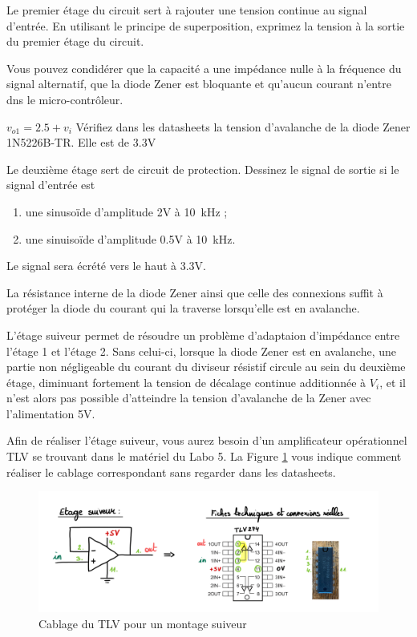 \documentclass{../template/labo}
\begin{document}
\begin{predet}

\Question
{Le premier étage du circuit sert à rajouter une tension continue au signal d'entrée. En utilisant le principe de superposition, exprimez la tension à la sortie du premier étage du circuit. 

Vous pouvez condidérer que la capacité a une impédance nulle à la fréquence du signal alternatif, que la diode Zener est bloquante et qu'aucun courant n'entre dns le micro-contrôleur. }
{$v_{o1}=2.5+v_i$}
\label{Q:zener_1}
\Question
{Vérifiez dans les datasheets la tension d'avalanche de la diode Zener 1N5226B-TR. }
{Elle est de 3.3V}
\label{Q:zener_2}
\Question
{Le deuxième étage sert de circuit de protection. Dessinez le signal de sortie si le signal d'entrée est 
\begin{enumerate}
	\item une sinusoïde d'amplitude 2V à 10~kHz ;
	\item une sinuisoïde d'amplitude 0.5V à 10~kHz.
\end{enumerate}
}
{Le signal sera écrété vers le haut à 3.3V. }
\label{Q:zener_3}

\end{predet}
\begin{info}
	La résistance interne de la diode Zener ainsi que celle des connexions suffit à protéger la diode du courant qui la traverse lorsqu'elle est en avalanche.
\end{info}
\begin{info}
	L'étage suiveur permet de résoudre un problème d'adaptaion d'impédance entre l'étage 1 et l'étage 2. Sans celui-ci, lorsque la diode Zener est en avalanche, une partie non négligeable du courant du diviseur résistif circule au sein du deuxième étage, diminuant fortement la tension de décalage continue additionnée à $V_i$, et il n'est alors pas possible d'atteindre la tension d'avalanche de la Zener avec l'alimentation 5V.
\end{info}

\begin{info}
    Afin de réaliser l'étage suiveur, vous aurez besoin d'un amplificateur opérationnel TLV se trouvant dans le matériel du Labo 5. La Figure \ref{fig:tlv_suiveur} vous indique comment réaliser le cablage correspondant sans regarder dans les datasheets.
\end{info}

\begin{figure}[h!]
    \begin{center}
        \includegraphics[scale=0.2]{figures/tlv_suiveur.png}
    \end{center}
    \caption{Cablage du TLV pour un montage suiveur}
    \label{fig:tlv_suiveur}
\end{figure}
\end{document}
